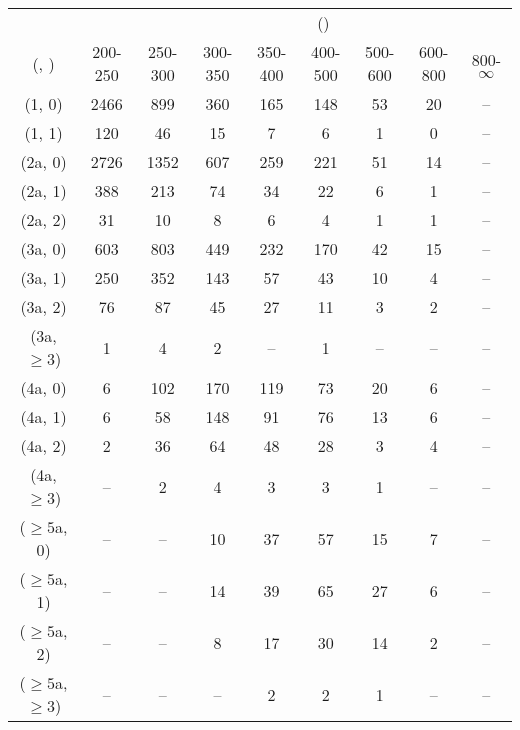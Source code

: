 \begin{table}[h!]
\tiny
\centering
{}
\begin{tabular}
{ccccccccc}
	\hline\hline
&	& \multicolumn{8}{c}{\scalht (\gev)} \\ 
	 (\njet,  \nb) & 200-250 & 250-300 & 300-350 & 350-400 & 400-500 & 500-600 & 600-800 & 800-$\infty$ \\ [0.8ex] 
\hline
	(1, 0) & 2466 & 899 & 360 & 165 & 148 & 53 & 20 & -- \\[0.5ex] 
	(1, 1) & 120 & 46 & 15 & 7 & 6 & 1 & 0 & -- \\[0.5ex] 
	(2a, 0) & 2726 & 1352 & 607 & 259 & 221 & 51 & 14 & -- \\[0.5ex] 
	(2a, 1) & 388 & 213 & 74 & 34 & 22 & 6 & 1 & -- \\[0.5ex] 
	(2a, 2) & 31 & 10 & 8 & 6 & 4 & 1 & 1 & -- \\[0.5ex] 
	(3a, 0) & 603 & 803 & 449 & 232 & 170 & 42 & 15 & -- \\[0.5ex] 
	(3a, 1) & 250 & 352 & 143 & 57 & 43 & 10 & 4 & -- \\[0.5ex] 
	(3a, 2) & 76 & 87 & 45 & 27 & 11 & 3 & 2 & -- \\[0.5ex] 
	(3a, $\ge3$) & 1 & 4 & 2 & -- & 1 & -- & -- & -- \\[0.5ex] 
	(4a, 0) & 6 & 102 & 170 & 119 & 73 & 20 & 6 & -- \\[0.5ex] 
	(4a, 1) & 6 & 58 & 148 & 91 & 76 & 13 & 6 & -- \\[0.5ex] 
	(4a, 2) & 2 & 36 & 64 & 48 & 28 & 3 & 4 & -- \\[0.5ex] 
	(4a, $\ge3$) & -- & 2 & 4 & 3 & 3 & 1 & -- & -- \\[0.5ex] 
	($\ge5$a, 0) & -- & -- & 10 & 37 & 57 & 15 & 7 & -- \\[0.5ex] 
	($\ge5$a, 1) & -- & -- & 14 & 39 & 65 & 27 & 6 & -- \\[0.5ex] 
	($\ge5$a, 2) & -- & -- & 8 & 17 & 30 & 14 & 2 & -- \\[0.5ex] 
	($\ge5$a, $\ge3$) & -- & -- & -- & 2 & 2 & 1 & -- & -- \\[0.5ex] 
	\hline
	\hline
\end{tabular}
\end{table}

